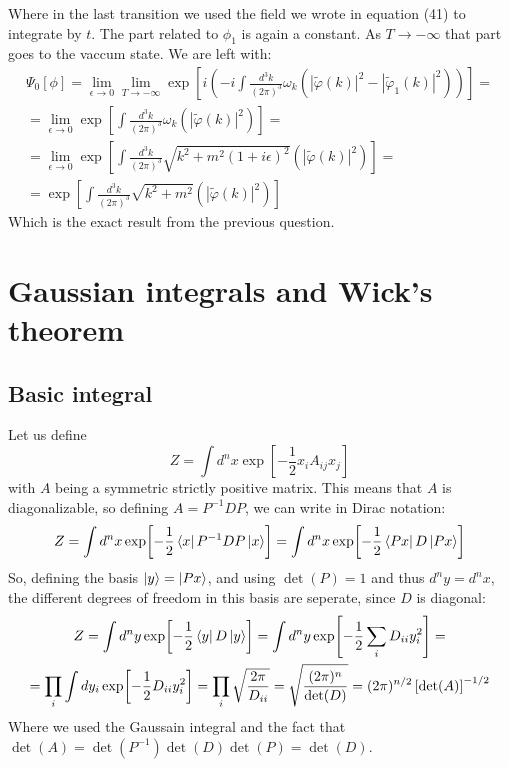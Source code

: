 \documentclass{article}
\begin{document}
Where in the last transition we used the field we wrote in equation (41) to integrate by $t$. The part related to $\phi_1$ is again a constant. As $T \rightarrow -\infty$ that part goes to the vaccum state. We are left with:
\begin{equation}
\begin{gathered}
    \Psi_0[\phi] = \lim_{\epsilon\rightarrow0}\lim_{T\rightarrow-\infty}\exp[i \left(
        -i\int \frac{d^3k}{(2\pi)^3}\omega_k
    \left(
        \left|\tilde{\varphi}(k)\right|^2
        -
        \left|\tilde{\varphi}_1(k)\right|^2
    \right)
    \right)] = \\ =
    \lim_{\epsilon\rightarrow0}\exp[
        \int \frac{d^3k}{(2\pi)^3}\omega_k
    \left(
        \left|\tilde{\varphi}(k)\right|^2
    \right)] = \\ =
    \lim_{\epsilon\rightarrow0}\exp[
        \int \frac{d^3k}{(2\pi)^3}\sqrt{k^2 + m^2(1 + i\epsilon)^2}
    \left(
        \left|\tilde{\varphi}(k)\right|^2
    \right)] = \\ =
    \exp[\int \frac{d^3k}{(2\pi)^3}\sqrt{k^2 + m^2}
    \left(
        \left|\tilde{\varphi}(k)\right|^2
    \right)]
\end{gathered}
\end{equation}
Which is the exact result from the previous question.

\newpage
\section{Gaussian integrals and Wick’s theorem}
\subsection{Basic integral}
Let us define
\begin{equation}
    Z = \int d^nx \exp[-\frac{1}{2}x_iA_{ij}x_j]
\end{equation}
with $A$ being a symmetric strictly positive matrix. This means that $A$ is diagonalizable, so defining $A = P^{-1}DP$, we can write in Dirac notation:
\begin{equation}
    Z = \int d^nx \exp[-\frac{1}{2}\bra{x}P^{-1}DP\ket{x}] = \int d^nx \exp[-\frac{1}{2}\bra{Px}D\ket{Px}]
\end{equation}
So, defining the basis $\ket{y} = \ket{Px}$, and using $\det(P) = 1$ and thus $d^ny = d^nx$, the different degrees of freedom in this basis are seperate, since $D$ is diagonal:
\begin{equation}
\begin{gathered}
    Z = \int d^ny \exp[-\frac{1}{2}\bra{y}D\ket{y}] =
    \int d^ny \exp[-\frac{1}{2}\sum_i D_{ii}y_i^2] = \\ =
    \prod_i \int dy_i \exp[-\frac{1}{2}D_{ii}y_i^2] =
    \prod_i \sqrt{\frac{2\pi}{D_{ii}}} =
    \sqrt{\frac{(2\pi)^n}{\det(D)}} = (2\pi)^{n/2}\left[\det(A)\right]^{-1/2}
\end{gathered}
\end{equation}
Where we used the Gaussain integral and the fact that $\det(A) = \det(P^{-1})\det(D)\det(P) = \det(D)$.
\end{document}
